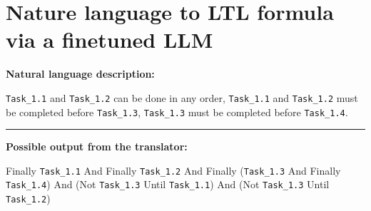 \documentclass{article}
\begin{document}
\section*{Nature language to LTL formula via a finetuned LLM}%
    \textbf{Natural language description:}
    
    \texttt{Task\_1.1} and \texttt{Task\_1.2} can be done in any order, \texttt{Task\_1.1} and \texttt{Task\_1.2} must be completed before \texttt{Task\_1.3}, \texttt{Task\_1.3} must be completed before \texttt{Task\_1.4}.

\noindent\rule{16cm}{0.4pt}
    
    \textbf{Possible output from the translator:}
    
    Finally \texttt{Task\_1.1} And Finally \texttt{Task\_1.2} And Finally (\texttt{Task\_1.3} And Finally \texttt{Task\_1.4}) And (Not \texttt{Task\_1.3} Until \texttt{Task\_1.1}) And (Not \texttt{Task\_1.3} Until \texttt{Task\_1.2})
    
    
\end{document}

